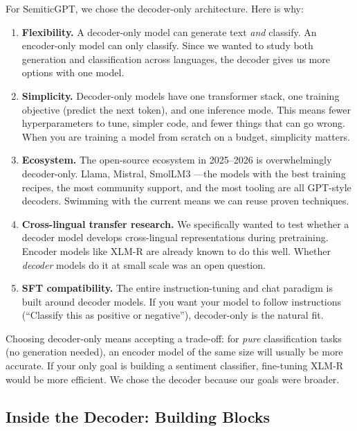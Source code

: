 \documentclass[11pt,a4paper]{article}
\begin{document}
For SemiticGPT, we chose the decoder-only architecture. Here is why:

\begin{enumerate}
    \item \textbf{Flexibility.} A decoder-only model can generate text \emph{and} classify. An encoder-only model can only classify. Since we wanted to study both generation and classification across languages, the decoder gives us more options with one model.

    \item \textbf{Simplicity.} Decoder-only models have one transformer stack, one training objective (predict the next token), and one inference mode. This means fewer hyperparameters to tune, simpler code, and fewer things that can go wrong. When you are training a model from scratch on a budget, simplicity matters.

    \item \textbf{Ecosystem.} The open-source ecosystem in 2025--2026 is overwhelmingly decoder-only. Llama, Mistral, SmolLM3 \citep{allal2025smollm3}---the models with the best training recipes, the most community support, and the most tooling are all GPT-style decoders. Swimming with the current means we can reuse proven techniques.

    \item \textbf{Cross-lingual transfer research.} We specifically wanted to test whether a decoder model develops cross-lingual representations during pretraining. Encoder models like XLM-R \citep{conneau2020unsupervised} are already known to do this well. Whether \emph{decoder} models do it at small scale was an open question.

    \item \textbf{SFT compatibility.} The entire instruction-tuning and chat paradigm is built around decoder models. If you want your model to follow instructions (``Classify this as positive or negative''), decoder-only is the natural fit.
\end{enumerate}

\begin{warning}
Choosing decoder-only means accepting a trade-off: for \emph{pure} classification tasks (no generation needed), an encoder model of the same size will usually be more accurate. If your only goal is building a sentiment classifier, fine-tuning XLM-R would be more efficient. We chose the decoder because our goals were broader.
\end{warning}

\subsection{Inside the Decoder: Building Blocks}
\end{document}
